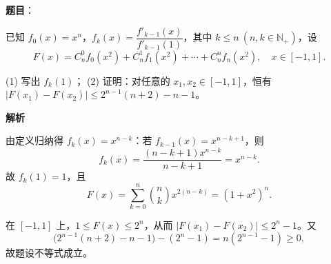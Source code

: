 \begin{answer}

\textbf{题目}：

已知 $f_0(x)=x^n$，$f_k(x)=\dfrac{f'_{k-1}(x)}{f'_{k-1}(1)}$，其中 $k\leq n\ (n,k\in\mathbb N_+)$，设
\nopagebreak[4]
\[
F(x)=C_n^0f_0(x^2)+C_n^1f_1(x^2)+\cdots+C_n^nf_n(x^2),\quad x\in[-1,1].
\]

(1) 写出 $f_k(1)$；
(2) 证明：对任意的 $x_1,x_2\in[-1,1]$，恒有 $|F(x_1)-F(x_2)|\leq2^{n-1}(n+2)-n-1$。

\textbf{解析}


由定义归纳得 $f_k(x)=x^{n-k}$：若 $f_{k-1}(x)=x^{n-k+1}$，则
\nopagebreak[4]
\[
f_k(x)=\frac{(n-k+1)x^{n-k}}{n-k+1}=x^{n-k}.
\]
故 $f_k(1)=1$，且
\nopagebreak[4]
\[
F(x)=\sum_{k=0}^{n}\binom nk x^{2(n-k)}=(1+x^2)^n.
\]

在 $[-1,1]$ 上，$1\le F(x)\le2^n$，从而 $|F(x_1)-F(x_2)|\le2^n-1$。又
\nopagebreak[4]
\[
\bigl(2^{n-1}(n+2)-n-1\bigr)-(2^n-1)
=n(2^{n-1}-1)\ge0,
\]
故题设不等式成立。



\end{answer}
